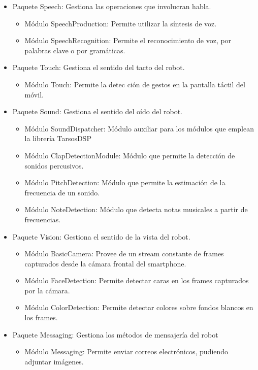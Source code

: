 \begin{itemize}
	\item Paquete Speech: Gestiona las operaciones que involucran habla.
		\begin{itemize}
		\item Módulo SpeechProduction: Permite utilizar la síntesis de voz.
		\item Módulo SpeechRecognition: Permite el reconocimiento de voz, por palabras clave o por gramáticas.
		\end{itemize}
	\item Paquete Touch: Gestiona el sentido del tacto del robot.
		\begin{itemize}
		\item Módulo Touch: Permite la detec	ción de gestos en la pantalla táctil del móvil.
		\end{itemize}
	\item Paquete Sound: Gestiona el sentido del oído del robot.
		\begin{itemize}
		\item Módulo SoundDispatcher: Módulo auxiliar para los módulos que emplean la librería TarsosDSP\cite{six2014tarsosdsp}
		\item Módulo ClapDetectionModule: Módulo que permite la detección de sonidos percusivos.
		\item Módulo PitchDetection: Módulo que permite la estimación de la frecuencia de un sonido.
		\item Módulo NoteDetection: Módulo que detecta notas musicales a partir de frecuencias.
		\end{itemize}
	\item Paquete Vision: Gestiona el sentido de la vista del robot.
	\begin{itemize}
	\item Módulo BasicCamera: Provee de un stream constante de frames capturados desde la cámara frontal del smartphone.
	\item Módulo FaceDetection: Permite detectar caras en los frames capturados por la cámara.
	\item Módulo ColorDetection: Permite detectar colores sobre fondos blancos en los frames.
	
	\end{itemize}
	\item Paquete Messaging: Gestiona los métodos de mensajería del robot
		\begin{itemize}
		\item Módulo Messaging: Permite enviar correos electrónicos, pudiendo adjuntar imágenes.
		\end{itemize}
\end{itemize}


